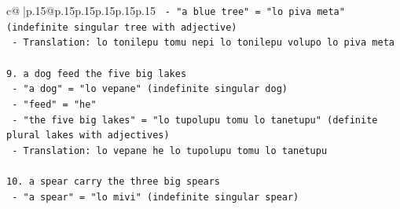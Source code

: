 \documentclass{article}
\begin{document}
{\begin{supertabular}{c@{$\;$}|p{.15\linewidth}@{}p{.15\linewidth}p{.15\linewidth}p{.15\linewidth}p{.15\linewidth}p{.15\linewidth}}
{{{\texttt{   {-} "a blue tree" = "lo piva meta" (indefinite singular tree with adjective)} \\
\texttt{   {-} Translation: lo tonilepu tomu nepi lo tonilepu volupo lo piva meta} \\
\\ 
\texttt{9. a dog feed the five big lakes} \\
\texttt{   {-} "a dog" = "lo vepane" (indefinite singular dog)} \\
\texttt{   {-} "feed" = "he"} \\
\texttt{   {-} "the five big lakes" = "lo tupolupu tomu lo tanetupu" (definite plural lakes with adjectives)} \\
\texttt{   {-} Translation: lo vepane he lo tupolupu tomu lo tanetupu} \\
\\ 
\texttt{10. a spear carry the three big spears} \\
\texttt{    {-} "a spear" = "lo mivi" (indefinite singular spear)} \\
}}}
\end{supertabular}}
\end{document}
